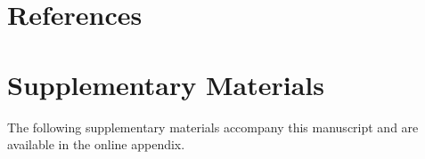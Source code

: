 \documentclass[11pt]{article}
\begin{document}
\section*{References}

\renewcommand{\refname}{}





\clearpage
\section*{Supplementary Materials}

The following supplementary materials accompany this manuscript and are available in the online appendix.
\end{document}
